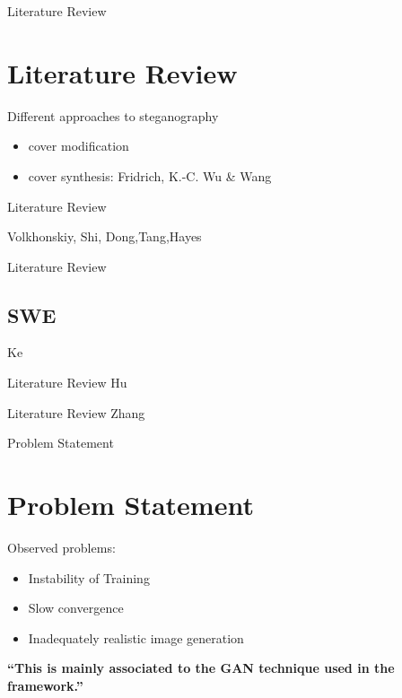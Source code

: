 \documentclass[11pt]{beamer}
\begin{document}
\begin{frame}{Literature Review}

\section{Literature Review}
Different approaches to steganography
\begin{itemize}
	\item cover modification 
	\item cover synthesis: Fridrich, K.-C. Wu \& Wang
\end{itemize}

\end{frame}

\begin{frame} {Literature Review}

Volkhonskiy, Shi, Dong,Tang,Hayes
\end{frame}

\begin{frame}{Literature Review}
	\subsection{SWE}
	Ke
\end{frame}

\begin{frame}{Literature Review}
	Hu
\end{frame}

\begin{frame}{Literature Review}
	Zhang
\end{frame}

\begin{frame}{Problem Statement}
	\section{Problem Statement}
	
	Observed problems: 
	\begin{itemize}
		\item Instability of Training
		\item Slow convergence
		\item Inadequately realistic image generation
	\end{itemize}

\pause
\textbf{\textquotedblleft This is mainly associated to the GAN technique used in the
	framework.\textquotedblright}
\end{frame}
\end{document}
